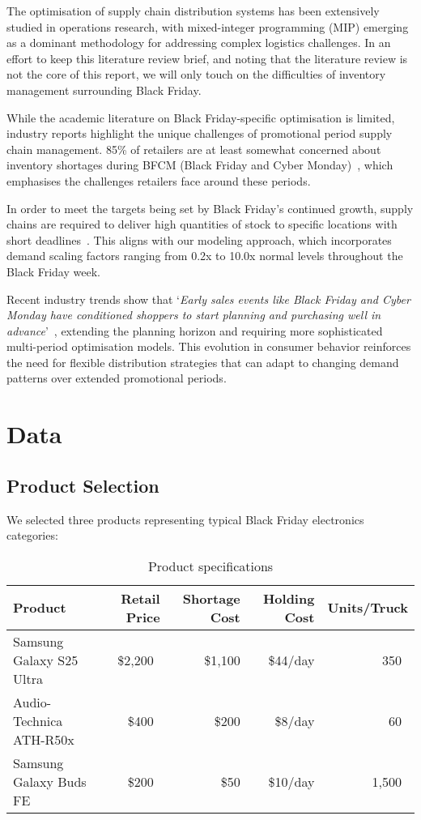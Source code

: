 \documentclass[a4paper,12pt]{article}
\begin{document}
The optimisation of supply chain distribution systems has been extensively studied in operations research, with mixed-integer programming (MIP) emerging as a dominant methodology for addressing complex logistics challenges.
In an effort to keep this literature review brief, and noting that the literature review is not the core of this report, we will only touch on the difficulties of inventory management surrounding Black Friday.

While the academic literature on Black Friday-specific optimisation is limited, industry reports highlight the unique challenges of promotional period supply chain management.
85\% of retailers are at least somewhat concerned about inventory shortages during BFCM (Black Friday and Cyber Monday)~\cite{anvyl2023black}, which emphasises the challenges retailers face around these periods.

In order to meet the targets being set by Black Friday's continued growth, supply chains are required to deliver high quantities of stock to specific locations with short deadlines~\cite{scmag2024black}.
This aligns with our modeling approach, which incorporates demand scaling factors ranging from 0.2x to 10.0x normal levels throughout the Black Friday week.

Recent industry trends show that `\textit{Early sales events like Black Friday and Cyber Monday have conditioned shoppers to start planning and purchasing well in advance}'~\cite{sc247consumer}, extending the planning horizon and requiring more sophisticated multi-period optimisation models.
This evolution in consumer behavior reinforces the need for flexible distribution strategies that can adapt to changing demand patterns over extended promotional periods.




\section{Data}\label{sec:data}

\subsection{Product Selection}\label{subsec:product-selection}
We selected three products representing typical Black Friday electronics categories:

\begin{table}[h]
\centering
\caption{Product specifications}
\begin{tabular}{lrrrr}
\toprule
Product & Retail Price & Shortage Cost & Holding Cost & Units/Truck \\
\midrule
Samsung Galaxy S25 Ultra & \$2,200~\cite{phonecost} & \$1,100 & \$44/day & 350~\cite{phonespecs} \\
Audio-Technica ATH-R50x & \$400~\cite{headphonescost} & \$200 & \$8/day & 60~\cite{headphonesspecs} \\
Samsung Galaxy Buds FE & \$200~\cite{earphonescost} & \$50 & \$10/day & 1,500~\cite{earphonesspecs} \\
\bottomrule
\end{tabular}\label{tab:table}
\end{table}
\end{document}
